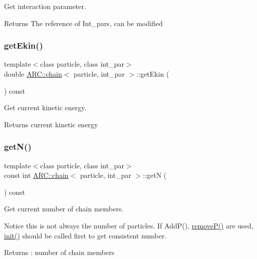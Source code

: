 Get interaction parameter. 

\begin{DoxyReturn}{Returns}
The reference of Int\+\_\+pars, can be modified 
\end{DoxyReturn}
\hypertarget{classARC_1_1chain_aec4fe3207a5fe2d0a254bdd4bb54ae7f}{}\label{classARC_1_1chain_aec4fe3207a5fe2d0a254bdd4bb54ae7f} 
\subsubsection{\texorpdfstring{get\+Ekin()}{getEkin()}}
{\footnotesize\ttfamily template$<$class particle, class int\+\_\+par$>$ \\
double \hyperlink{classARC_1_1chain}{A\+R\+C\+::chain}$<$ particle, int\+\_\+par $>$\+::get\+Ekin (\begin{DoxyParamCaption}{ }\end{DoxyParamCaption}) const\hspace{0.3cm}{\ttfamily [inline]}}



Get current kinetic energy. 

\begin{DoxyReturn}{Returns}
current kinetic energy 
\end{DoxyReturn}
\hypertarget{classARC_1_1chain_a582ad9ae8003400e06bba908d70d60d9}{}\label{classARC_1_1chain_a582ad9ae8003400e06bba908d70d60d9} 
\subsubsection{\texorpdfstring{get\+N()}{getN()}}
{\footnotesize\ttfamily template$<$class particle, class int\+\_\+par$>$ \\
const int \hyperlink{classARC_1_1chain}{A\+R\+C\+::chain}$<$ particle, int\+\_\+par $>$\+::getN (\begin{DoxyParamCaption}{ }\end{DoxyParamCaption}) const\hspace{0.3cm}{\ttfamily [inline]}}



Get current number of chain members. 

Notice this is not always the number of particles. If Add\+P(), \hyperlink{classARC_1_1chain_a450a7459b076331b6aaa888d209e888c}{remove\+P()} are used, \hyperlink{classARC_1_1chain_a3fe37720ceb48c14905c92d3e25e71a4}{init()} should be called first to get consistent number. \begin{DoxyReturn}{Returns}
\+: number of chain members 
\end{DoxyReturn}
\hypertarget{classARC_1_1chain_ad8bacf5ad6ea0bb31bdb457e4c626701}{}\label{classARC_1_1chain_ad8bacf5ad6ea0bb31bdb457e4c626701} 

